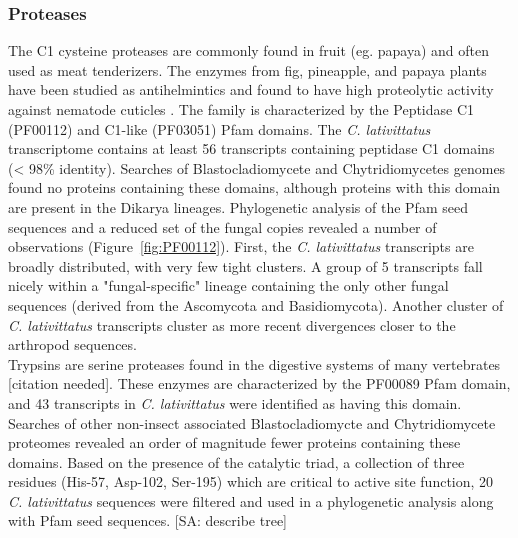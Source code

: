 \subsubsection*{Proteases} 
The C1 cysteine proteases are commonly found in fruit (eg. papaya) and often used as meat tenderizers. The enzymes from fig, pineapple, and papaya plants have been studied as antihelmintics and found to have high proteolytic activity against nematode cuticles \cite{Stepek2004}. The family is characterized by the Peptidase C1 (PF00112) and C1-like (PF03051) Pfam domains. The \textit{C. lativittatus} transcriptome contains at least 56 transcripts containing peptidase C1 domains (< 98\% identity). Searches of Blastocladiomycete and Chytridiomycetes genomes found no proteins containing these domains, although proteins with this domain are present in the Dikarya lineages. Phylogenetic analysis of the Pfam seed sequences and a reduced set of the fungal copies revealed a number of observations (Figure~\ref{fig:PF00112}). First, the \textit{C. lativittatus} transcripts are broadly distributed, with very few tight clusters. A group of 5 transcripts fall nicely within a "fungal-specific" lineage containing the only other fungal sequences (derived from the Ascomycota and Basidiomycota). Another cluster of \textit{C. lativittatus} transcripts cluster as more recent divergences closer to the arthropod sequences. \\
\indent Trypsins are serine proteases found in the digestive systems of many vertebrates [citation needed]. These enzymes are characterized by the PF00089 Pfam domain, and 43 transcripts in \textit{C. lativittatus} were identified as having this domain. Searches of other non-insect associated Blastocladiomycte and Chytridiomycete proteomes revealed an order of magnitude fewer proteins containing these domains. Based on the presence of the catalytic triad, a collection of three residues (His-57, Asp-102, Ser-195) which are critical to active site function, 20 \textit{C. lativittatus} sequences were filtered and used in a phylogenetic analysis along with Pfam seed sequences. [SA: describe tree]\\
